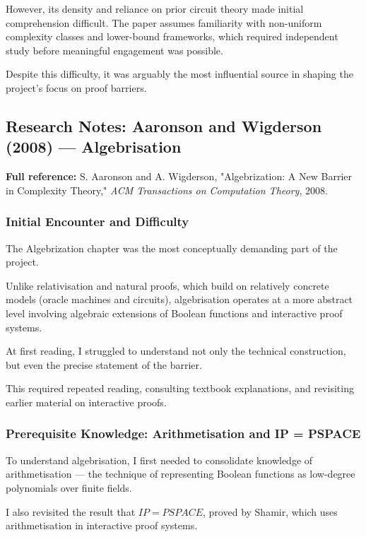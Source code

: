 \documentclass[12pt]{article}
\begin{document}
However, its density and reliance on prior circuit theory made initial comprehension difficult. The paper assumes familiarity with non-uniform complexity classes and lower-bound frameworks, which required independent study before meaningful engagement was possible.

Despite this difficulty, it was arguably the most influential source in shaping the project's focus on proof barriers.

\subsection{Research Notes: Aaronson and Wigderson (2008) --- Algebrisation}

\textbf{Full reference:} S. Aaronson and A. Wigderson, 
"Algebrization: A New Barrier in Complexity Theory," 
\textit{ACM Transactions on Computation Theory}, 2008.

\subsubsection*{Initial Encounter and Difficulty}

The Algebrization chapter was the most conceptually demanding part of the project.

Unlike relativisation and natural proofs, which build on relatively concrete models (oracle machines and circuits), algebrisation operates at a more abstract level involving algebraic extensions of Boolean functions and interactive proof systems.

At first reading, I struggled to understand not only the technical construction, but even the precise statement of the barrier.

This required repeated reading, consulting textbook explanations, and revisiting earlier material on interactive proofs.

\subsubsection*{Prerequisite Knowledge: Arithmetisation and IP = PSPACE}

To understand algebrisation, I first needed to consolidate knowledge of arithmetisation --- the technique of representing Boolean functions as low-degree polynomials over finite fields.

I also revisited the result that $IP = PSPACE$, proved by Shamir, which uses arithmetisation in interactive proof systems.
\end{document}
